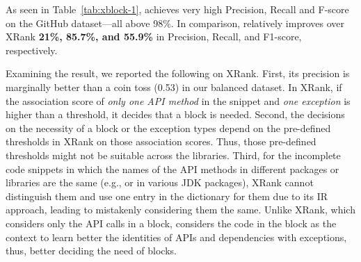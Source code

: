 

As seen in Table~\ref{tab:xblock-1}, {\tool} achieves very high
Precision, Recall and F-score on the GitHub dataset---all above
98\%.
In comparison, {\tool} relatively improves over XRank {\bf 21\%, 85.7\%,
and 55.9\%} in Precision, Recall, and F1-score, respectively.

Examining the result, we reported the following on XRank. First,
its precision is marginally better than a coin toss (0.53) in our
balanced dataset. In XRank, if the association score of {\em only one
  API method} in the snippet and {\em one exception} is higher than a
threshold, it decides that a  block is needed.
%
Second, the decisions on the necessity of a  block or
the exception types depend on the pre-defined thresholds in XRank on
those association scores. Thus, those pre-defined thresholds might not
be suitable across the libraries. Third, for the incomplete code
snippets in which the names of the API methods in different packages
or libraries are the same (e.g.,  or  in
various JDK packages), XRank cannot distinguish them and use one entry
in the dictionary for them due to its IR approach, leading to
mistakenly considering them the same. Unlike XRank, which
considers only the API calls in a  block,
{\tool} considers the code in the block as the context to learn better
the identities of APIs and dependencies with exceptions,
thus, better deciding the need of  blocks.



